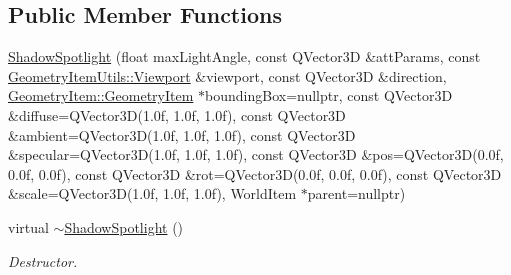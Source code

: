 \subsection*{Public Member Functions}
\begin{DoxyCompactItemize}
\item 
\mbox{\hyperlink{class_geometry_engine_1_1_geometry_world_item_1_1_geometry_light_1_1_shadow_spotlight_acd334b4a1d25cf529996f7960eb84312}{Shadow\+Spotlight}} (float max\+Light\+Angle, const Q\+Vector3D \&att\+Params, const \mbox{\hyperlink{class_geometry_engine_1_1_geometry_item_utils_1_1_viewport}{Geometry\+Item\+Utils\+::\+Viewport}} \&viewport, const Q\+Vector3D \&direction, \mbox{\hyperlink{class_geometry_engine_1_1_geometry_world_item_1_1_geometry_item_1_1_geometry_item}{Geometry\+Item\+::\+Geometry\+Item}} $\ast$bounding\+Box=nullptr, const Q\+Vector3D \&diffuse=Q\+Vector3D(1.\+0f, 1.\+0f, 1.\+0f), const Q\+Vector3\+D \&ambient=\+Q\+Vector3\+D(1.\+0f, 1.\+0f, 1.\+0f), const Q\+Vector3\+D \&specular=\+Q\+Vector3\+D(1.\+0f, 1.\+0f, 1.\+0f), const Q\+Vector3\+D \&pos=\+Q\+Vector3\+D(0.\+0f, 0.\+0f, 0.\+0f), const Q\+Vector3\+D \&rot=\+Q\+Vector3\+D(0.\+0f, 0.\+0f, 0.\+0f), const Q\+Vector3\+D \&scale=\+Q\+Vector3\+D(1.\+0f, 1.\+0f, 1.\+0f), World\+Item $\ast$parent=nullptr)
\item 
\mbox{\label{class_geometry_engine_1_1_geometry_world_item_1_1_geometry_light_1_1_shadow_spotlight_a1f4f0d06e4d09e72486844832122c01a}} 
virtual \mbox{\hyperlink{class_geometry_engine_1_1_geometry_world_item_1_1_geometry_light_1_1_shadow_spotlight_a1f4f0d06e4d09e72486844832122c01a}{$\sim$\+Shadow\+Spotlight}} ()
\begin{DoxyCompactList}\small\item\em Destructor. \end{DoxyCompactList}\end{DoxyCompactItemize}

